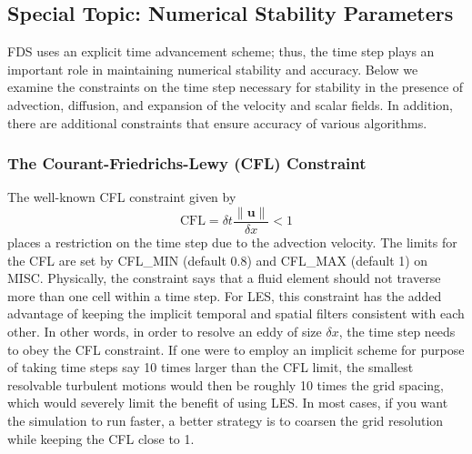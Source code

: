 \documentclass[11pt]{book}
\begin{document}
\subsection{Special Topic: Numerical Stability Parameters}
\label{info:CFL}

FDS uses an explicit time advancement scheme; thus, the time step plays an important role in maintaining numerical stability and accuracy. Below we examine the constraints on the time step necessary for stability in the presence of advection, diffusion, and expansion of the velocity and scalar fields. In addition, there are additional constraints that ensure accuracy of various algorithms.

\subsubsection{The Courant-Friedrichs-Lewy (CFL) Constraint}

The well-known CFL constraint given by
\begin{equation}
\mbox{CFL} = \delta t \frac{\|\mathbf{u}\|}{\delta x} < 1
\end{equation}
places a restriction on the time step due to the advection velocity.  The limits for the CFL are set by {\ct CFL\_MIN} (default 0.8) and {\ct CFL\_MAX} (default 1) on {\ct MISC}. Physically, the constraint says that a fluid element should not traverse more than one cell within a time step. For LES, this constraint has the added advantage of keeping the implicit temporal and spatial filters consistent with each other. In other words, in order to resolve an eddy of size $\delta x$, the time step needs to obey the CFL constraint. If one were to employ an implicit scheme for purpose of taking time steps say 10 times larger than the CFL limit, the smallest resolvable turbulent motions would then be roughly 10 times the grid spacing, which would severely limit the benefit of using LES.  In most cases, if you want the simulation to run faster, a better strategy is to coarsen the grid resolution while keeping the CFL close to 1.
\end{document}
